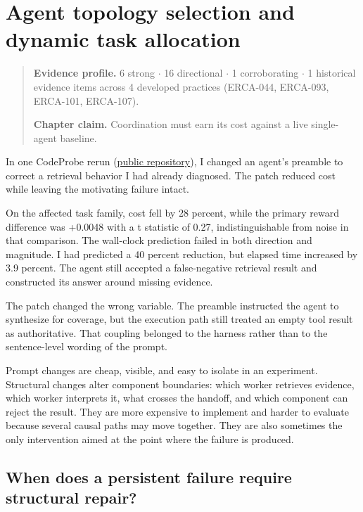 \chapter{Agent topology selection and dynamic task allocation}
\label{ch17-agent-topology-dynamic-task-allocation}
\begin{quote}
\textbf{Evidence profile.} 6 strong \(\cdot\) 16 directional \(\cdot\) 1 corroborating \(\cdot\) 1 historical evidence items across 4 developed practices (ERCA-044, ERCA-093, ERCA-101, ERCA-107).

\textbf{Chapter claim.} Coordination must earn its cost against a live single-agent baseline.
\end{quote}

In one CodeProbe rerun (\href{https://github.com/sjarmak/codeprobe}{public repository}), I changed an agent's preamble to correct a retrieval behavior I had already diagnosed. The patch reduced cost while leaving the motivating failure intact.

On the affected task family, cost fell by 28 percent, while the primary reward difference was +0.0048 with a t statistic of 0.27, indistinguishable from noise in that comparison. The wall-clock prediction failed in both direction and magnitude. I had predicted a 40 percent reduction, but elapsed time increased by 3.9 percent. The agent still accepted a false-negative retrieval result and constructed its answer around missing evidence.

The patch changed the wrong variable. The preamble instructed the agent to synthesize for coverage, but the execution path still treated an empty tool result as authoritative. That coupling belonged to the harness rather than to the sentence-level wording of the prompt.

Prompt changes are cheap, visible, and easy to isolate in an experiment. Structural changes alter component boundaries: which worker retrieves evidence, which worker interprets it, what crosses the handoff, and which component can reject the result. They are more expensive to implement and harder to evaluate because several causal paths may move together. They are also sometimes the only intervention aimed at the point where the failure is produced.

\hypertarget{when-does-a-persistent-failure-require-structural-repair}{%
\section{When does a persistent failure require structural repair?}\label{when-does-a-persistent-failure-require-structural-repair}}

